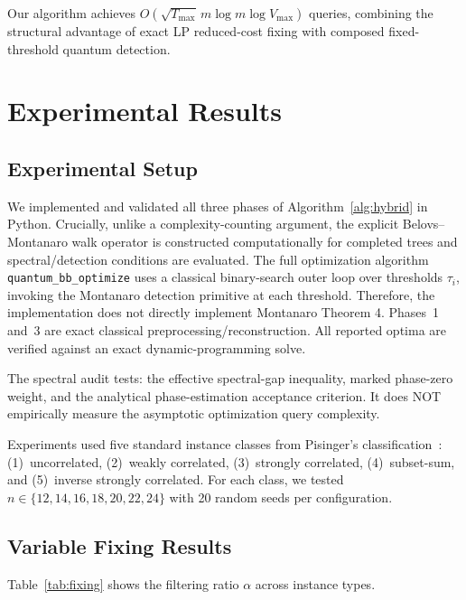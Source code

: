 \documentclass[conference]{IEEEtran}
\begin{document}
Our algorithm achieves $O\!\left(\sqrt{T_{\max}}\,m\log m\log V_{\max}\right)$ queries, combining the structural advantage of exact LP reduced-cost fixing with composed fixed-threshold quantum detection.




\section{Experimental Results}
\label{sec:experiments}

\subsection{Experimental Setup}
We implemented and validated all three phases of Algorithm~\ref{alg:hybrid} in Python. Crucially, unlike a complexity-counting argument, the explicit Belovs--Montanaro walk operator is constructed computationally for completed trees and spectral/detection conditions are evaluated. The full optimization algorithm \texttt{quantum\_bb\_optimize} uses a classical binary-search outer loop over thresholds $\tau_i$, invoking the Montanaro detection primitive at each threshold. Therefore, the implementation does not directly implement Montanaro Theorem 4. Phases~1 and~3 are exact classical preprocessing/reconstruction. All reported optima are verified against an exact dynamic-programming solve.

The spectral audit tests: the effective spectral-gap inequality, marked phase-zero weight, and the analytical phase-estimation acceptance criterion. It does NOT empirically measure the asymptotic optimization query complexity.

Experiments used five standard instance classes from Pisinger's classification~\cite{ref3}: (1)~uncorrelated, (2)~weakly correlated, (3)~strongly correlated, (4)~subset-sum, and (5)~inverse strongly correlated. For each class, we tested $n \in \{12, 14, 16, 18, 20, 22, 24\}$ with 20 random seeds per configuration.

\subsection{Variable Fixing Results}
Table~\ref{tab:fixing} shows the filtering ratio $\alpha$ across instance types.
\end{document}
